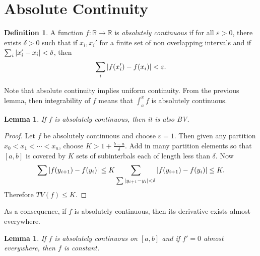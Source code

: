 \documentclass[leqno, openany]{memoir}
\newtheorem{lem}[thm]{Lemma}
\theoremstyle{definition}
\newtheorem{defn}[thm]{Definition}
\theoremstyle{remark}
\theoremstyle{plain}
\theoremstyle{definition}
\theoremstyle{remark}
\newcommand{\R}{\mathbb{R}}
\newcommand{\ep}{\varepsilon}
\begin{document}
\section{Absolute Continuity}%
\label{sec:absolute_continuity}

\begin{defn}
    A function $f: \R \to \R$ is \textit{absolutely continuous} if for all $\ep > 0$, there exists $\delta > 0$ such that if $x_i,x_i'$ for a finite set of non overlapping intervals and if $\sum_i \abs{x_i' - x_i} < \delta$, then
    \[ \sum_i \abs{f(x_i') - f(x_i)} < \ep. \]
\end{defn}

Note that absolute continuity implies uniform continuity. From the previous lemma, then integrability of $f$ means that $\int_a^x f$ is absolutely continuous.

\begin{lem}
    If $f$ is absolutely continuous, then it is also BV.
\end{lem}

\begin{proof}
    Let $f$ be absolutely continuous and choose $\ep = 1$. Then given any partition $x_0 < x_1 < \cdots < x_n$, choose $K > 1 + \frac{b - a}{\delta}$. Add in many partition elements so that $[a,b]$ is covered by $K$ sets of subinterbals each of length less than $\delta$. Now
    \[ \sum \abs{f(y_{i+1}) - f(y_i)} \leq K \sum_{\sum \abs{y_{i+1} - y_i} < \delta} \abs{f(y_{i+1}) - f(y_i)} \leq K. \]
    Therefore $TV(f) \leq K$.
\end{proof}

As a consequence, if $f$ is absolutely continuous, then its derivative exists almost everywhere.

\begin{lem}
    If $f$ is absolutely continuous on $[a,b]$ and if $f' = 0$ almost everywhere, then $f$ is constant.
\end{lem}
\end{document}

